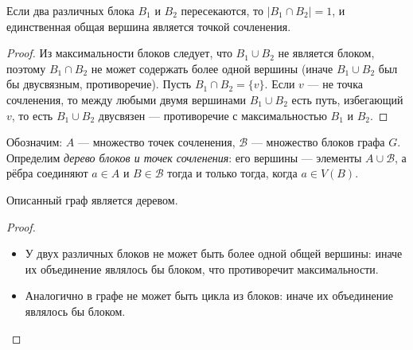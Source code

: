 \begin{Statement}{}{}
	Если два различных блока $B_1$ и $B_2$ пересекаются,
	то $|B_1 \cap B_2| = 1$, и единственная общая вершина
	является точкой сочленения.
\end{Statement}
\begin{proof}
	Из максимальности блоков следует, что $B_1 \cup B_2$ не является
	блоком, поэтому $B_1 \cap B_2$ не может содержать более одной
	вершины (иначе $B_1 \cup B_2$ был бы двусвязным, противоречие).
	Пусть $B_1 \cap B_2 = \{v\}$. Если $v$ --- не точка сочленения,
	то между любыми двумя вершинами $B_1 \cup B_2$ есть путь,
	избегающий $v$, то есть $B_1 \cup B_2$ двусвязен --- противоречие
	с максимальностью $B_1$ и $B_2$.
\end{proof}

Обозначим: $A$ --- множество точек сочленения, $\mathcal{B}$ ---
множество блоков графа $G$. Определим \emph{дерево блоков и точек
	сочленения}: его вершины --- элементы $A \cup \mathcal{B}$, а рёбра
соединяют $a \in A$ и $B \in \mathcal{B}$ тогда и только тогда,
когда $a \in V(B)$.

\begin{Theorem}{}{}
	Описанный граф является деревом.
\end{Theorem}
\begin{proof}
	\begin{itemize}
		\item У двух различных блоков не может быть более одной общей вершины:
		иначе их объединение являлось бы блоком, что противоречит максимальности.
		\item Аналогично в графе не может быть цикла из блоков:
		иначе их объединение являлось бы блоком.
	\end{itemize}
\end{proof}